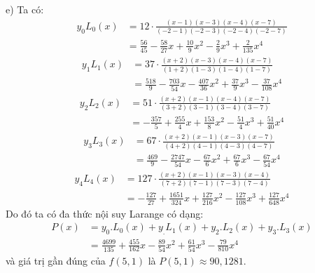 e) Ta có:
\begin{align*}
	y_0L_0(x)	& =12\cdot\frac{(x-1)(x-3)(x-4)(x-7)}{(-2-1)(-2-3)(-2-4)(-2-7)}\\
				& =\frac{56}{45}-\frac{58}{27}x+\frac{10}{9}x^2-\frac{2}{9}x^3+\frac{2}{135}x^4
\end{align*}
\begin{align*}
	y_1L_1(x)	& =37\cdot\frac{(x+2)(x-3)(x-4)(x-7)}{(1+2)(1-3)(1-4)(1-7)}\\
				& =\frac{518}{9}-\frac{703}{54}x-\frac{407}{36}x^2+\frac{37}{9}x^3-\frac{37}{108}x^4
\end{align*}
\begin{align*}
	y_2L_2(x)	& =51\cdot\frac{(x+2)(x-1)(x-4)(x-7)}{(3+2)(3-1)(3-4)(3-7)}\\
				& =-\frac{357}{5}+\frac{255}{4}x+\frac{153}{8}x^2-\frac{51}{4}x^3+\frac{51}{40}x^4
\end{align*}
\begin{align*}
	y_3L_3(x)	&=67\cdot\frac{(x+2)(x-1)(x-3)(x-7)}{(4+2)(4-1)(4-3)(4-7)}\\
				&=\frac{469}{9}-\frac{2747}{54}x-\frac{67}{6}x^2+\frac{67}{6}x^3-\frac{67}{54}x^4
\end{align*}
\begin{align*}
	y_4L_4(x)	& =127\cdot\frac{(x+2)(x-1)(x-3)(x-4)}{(7+2)(7-1)(7-3)(7-4)}\\
				& =-\frac{127}{27}+\frac{1651}{324}x+\frac{127}{216}x^2-\frac{127}{108}x^3+\frac{127}{648}x^4
\end{align*}
Do đó ta có đa thức nội suy Larange có dạng:
\begin{align*}
	P(x)	& =y_0.L_0(x)+y_.L_1(x)+y_2.L_2(x)+y_3.L_3(x)\\
			& =\frac{4699}{135} + \frac{455}{162}x - \frac{89}{54}x^2 + \frac{61}{54}x^3 - \frac{79}{810}x^4
\end{align*}
và giá trị gần đúng của $f(5,1)$ là $P(5,1)\approx 90,1281$.

